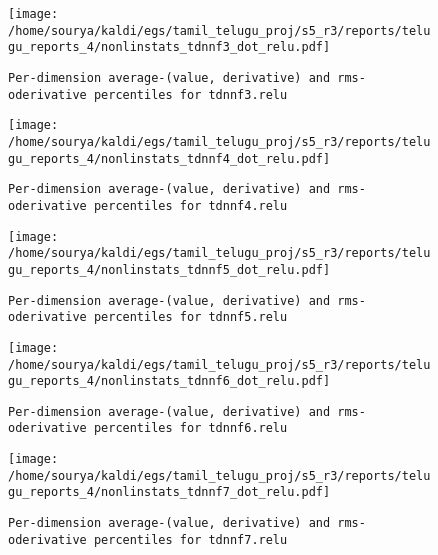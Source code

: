 \documentclass[prl,10pt,twocolumn]{revtex4}
\begin{document}
\newpage
\begin{figure}[h]
  \begin{center}
    \caption{\texttt{Per-dimension average-(value, derivative) and rms-oderivative percentiles for tdnnf3.relu}}
    \texttt{[image: /home/sourya/kaldi/egs/tamil\_telugu\_proj/s5\_r3/reports/telugu\_reports\_4/nonlinstats\_tdnnf3\_dot\_relu.pdf]}
  \end{center}
\end{figure}
\clearpage


\newpage
\begin{figure}[h]
  \begin{center}
    \caption{\texttt{Per-dimension average-(value, derivative) and rms-oderivative percentiles for tdnnf4.relu}}
    \texttt{[image: /home/sourya/kaldi/egs/tamil\_telugu\_proj/s5\_r3/reports/telugu\_reports\_4/nonlinstats\_tdnnf4\_dot\_relu.pdf]}
  \end{center}
\end{figure}
\clearpage


\newpage
\begin{figure}[h]
  \begin{center}
    \caption{\texttt{Per-dimension average-(value, derivative) and rms-oderivative percentiles for tdnnf5.relu}}
    \texttt{[image: /home/sourya/kaldi/egs/tamil\_telugu\_proj/s5\_r3/reports/telugu\_reports\_4/nonlinstats\_tdnnf5\_dot\_relu.pdf]}
  \end{center}
\end{figure}
\clearpage


\newpage
\begin{figure}[h]
  \begin{center}
    \caption{\texttt{Per-dimension average-(value, derivative) and rms-oderivative percentiles for tdnnf6.relu}}
    \texttt{[image: /home/sourya/kaldi/egs/tamil\_telugu\_proj/s5\_r3/reports/telugu\_reports\_4/nonlinstats\_tdnnf6\_dot\_relu.pdf]}
  \end{center}
\end{figure}
\clearpage


\newpage
\begin{figure}[h]
  \begin{center}
    \caption{\texttt{Per-dimension average-(value, derivative) and rms-oderivative percentiles for tdnnf7.relu}}
    \texttt{[image: /home/sourya/kaldi/egs/tamil\_telugu\_proj/s5\_r3/reports/telugu\_reports\_4/nonlinstats\_tdnnf7\_dot\_relu.pdf]}
  \end{center}
\end{figure}
\clearpage
\end{document}
